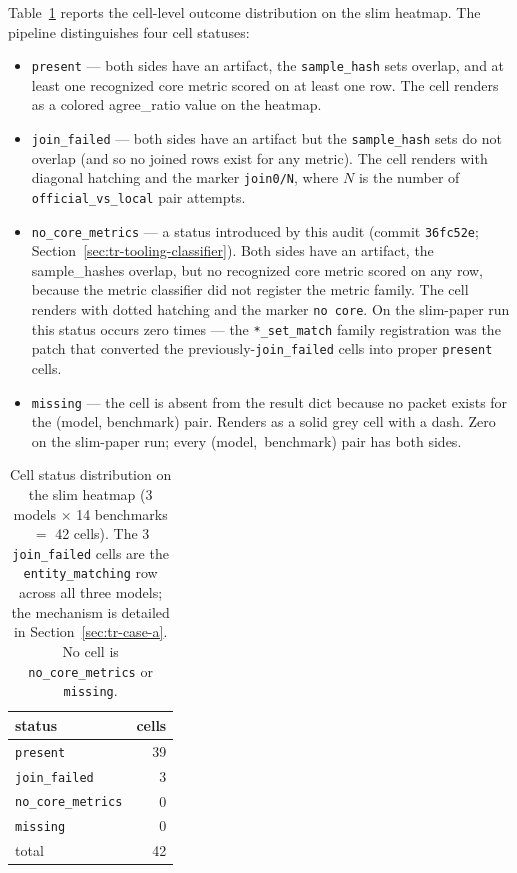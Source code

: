 \documentclass[11pt]{article}
\begin{document}
Table~\ref{tab:tr-cell-status} reports the cell-level outcome
  distribution on the slim heatmap.
The pipeline distinguishes four cell statuses:

\begin{itemize}
  \item \texttt{present} --- both sides have an artifact, the
        \texttt{sample\_hash} sets overlap, and at least one
        recognized core metric scored on at least one row.
        The cell renders as a colored agree\_ratio value on the
        heatmap.
  \item \texttt{join\_failed} --- both sides have an artifact but the
        \texttt{sample\_hash} sets do not overlap (and so no joined
        rows exist for any metric).
        The cell renders with diagonal hatching and the marker
        \texttt{join0/N}, where $N$ is the number of
        \texttt{official\_vs\_local} pair attempts.
  \item \texttt{no\_core\_metrics} --- a status introduced by this
        audit (commit \texttt{36fc52e};
        Section~\ref{sec:tr-tooling-classifier}).
        Both sides have an artifact, the sample\_hashes overlap, but
        no recognized core metric scored on any row, because the
        metric classifier did not register the metric family.
        The cell renders with dotted hatching and the marker
        \texttt{no core}.
        On the slim-paper run this status occurs zero times --- the
        \texttt{*\_set\_match} family registration was the patch
        that converted the previously-\texttt{join\_failed}
         cells into proper
        \texttt{present} cells.
  \item \texttt{missing} --- the cell is absent from the result dict
        because no packet exists for the (model, benchmark) pair.
        Renders as a solid grey cell with a dash.
        Zero on the slim-paper run; every \mbox{(model, benchmark)}
        pair has both sides.
\end{itemize}

\begin{table}[htbp]
\centering
\small
\caption{Cell status distribution on the slim heatmap (3 models
  $\times$ 14 benchmarks $=$ 42 cells).
The 3 \texttt{join\_failed} cells are the
  \texttt{entity\_matching} row across all three models; the
  mechanism is detailed in Section~\ref{sec:tr-case-a}.
No cell is \texttt{no\_core\_metrics} or \texttt{missing}.}
\label{tab:tr-cell-status}
\begin{tabular}{lr}
\toprule
status & cells \\
\midrule
\texttt{present}            & 39 \\
\texttt{join\_failed}       &  3 \\
\texttt{no\_core\_metrics}  &  0 \\
\texttt{missing}            &  0 \\
\midrule
total                       & 42 \\
\bottomrule
\end{tabular}
\end{table}
\end{document}

